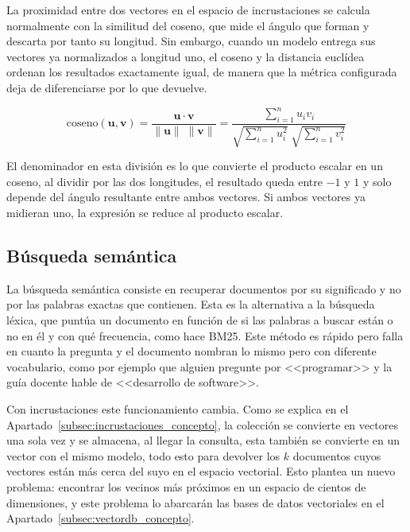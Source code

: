 La proximidad entre dos vectores en el espacio de incrustaciones se calcula normalmente con la similitud del coseno, que mide el ángulo que forman y descarta por tanto su longitud. Sin embargo, cuando un modelo entrega sus vectores ya normalizados a longitud uno, el coseno y la distancia euclídea ordenan los resultados exactamente igual, de manera que la métrica configurada deja de diferenciarse por lo que devuelve.

\begin{equation}
  \text{coseno}(\mathbf{u}, \mathbf{v})
  = \frac{\mathbf{u} \cdot \mathbf{v}}{\lVert \mathbf{u} \rVert \; \lVert \mathbf{v} \rVert}
  = \frac{\sum_{i=1}^{n} u_i v_i}
  {\sqrt{\sum_{i=1}^{n} u_i^{2}} \; \sqrt{\sum_{i=1}^{n} v_i^{2}}}
  \label{eq:coseno}
\end{equation}

El denominador en esta división es lo que convierte el producto escalar en un coseno, al dividir por las dos longitudes, el resultado queda entre $-1$ y $1$ y solo depende del ángulo resultante entre ambos vectores. Si ambos vectores ya midieran uno, la expresión se reduce al producto escalar.

\subsection[Búsqueda semántica]{Búsqueda semántica}
\label{subsec:busqueda_semantica_concepto}

La búsqueda semántica consiste en recuperar documentos por su significado y no por las palabras exactas que contienen. Esta es la alternativa a la búsqueda léxica, que puntúa un documento en función de si las palabras a buscar están o no en él y con qué frecuencia, como hace BM25\cite{robertson2009bm25}. Este método es rápido pero falla en cuanto la pregunta y el documento nombran lo mismo pero con diferente vocabulario, como por ejemplo que alguien pregunte por <<programar>> y la guía docente hable de <<desarrollo de software>>.

Con incrustaciones este funcionamiento cambia. Como se explica en el Apartado~\ref{subsec:incrustaciones_concepto}, la colección se convierte en vectores una sola vez y se almacena, al llegar la consulta, esta también se convierte en un vector con el mismo modelo, todo esto para devolver los $k$ documentos cuyos vectores están más cerca del suyo en el espacio vectorial. Esto plantea un nuevo problema: encontrar los vecinos más próximos en un espacio de cientos de dimensiones, y este problema lo abarcarán las bases de datos vectoriales en el Apartado~\ref{subsec:vectordb_concepto}.

